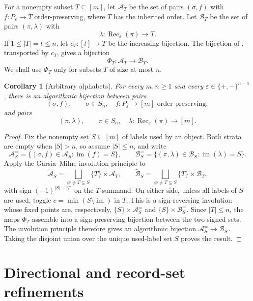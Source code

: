 \documentclass[10pt,a4paper]{amsart}
\newtheorem{corollary}[theorem]{Corollary}
\newcommand{\eps}{\varepsilon}
\begin{document}
For a nonempty subset \(T\subseteq[m]\), let \(\mathcal A_T\) be the set of
pairs \((\sigma,f)\) with \(f:P_\eps\to T\) order-preserving, where \(T\) has
the inherited order.  Let \(\mathcal B_T\) be the set of pairs
\((\pi,\lambda)\) with
\[
\lambda:\operatorname{Rec}_\eps(\pi)\to T.
\]
If \(1\le |T|=t\le n\), let \(c_T:[t]\to T\) be the increasing bijection.  The
bijection of , transported by \(c_T\), gives
a bijection
\[
\Phi_T:\mathcal A_T\longrightarrow \mathcal B_T.
\]
We shall use \(\Phi_T\) only for subsets \(T\) of size at most \(n\).

\begin{corollary}[Arbitrary alphabets]
\label{thm:direct-bijection-all-m}
For every \(m,n\ge1\) and every \(\eps\in\{+,-\}^{n-1}\), there is an
algorithmic bijection between pairs
\[
(\sigma,f),\qquad
\sigma\in S_n,\quad f:P_\eps\to[m]\text{ order-preserving},
\]
and pairs
\[
(\pi,\lambda),\qquad
\pi\in S_n,\quad
\lambda:\operatorname{Rec}_\eps(\pi)\to[m].
\]
\end{corollary}

\begin{proof}
Fix the nonempty set \(S\subseteq[m]\) of labels used by an object.  Both
strata are empty when \(|S|>n\), so assume \(|S|\le n\), and write
\[
\mathcal A_S^{=}
=\{(\sigma,f)\in\mathcal A_S:\operatorname{im}(f)=S\},
\qquad
\mathcal B_S^{=}
=\{(\pi,\lambda)\in\mathcal B_S:\operatorname{im}(\lambda)=S\}.
\]
Apply the Garsia--Milne involution principle \cite{GarsiaMilne} to
\[
\widetilde{\mathcal A}_S
=\bigsqcup_{\varnothing\ne T\subseteq S}\{T\}\times\mathcal A_T,
\qquad
\widetilde{\mathcal B}_S
=\bigsqcup_{\varnothing\ne T\subseteq S}\{T\}\times\mathcal B_T,
\]
with sign \((-1)^{|S|-|T|}\) on the \(T\)-summand.  On either side, unless
all labels of \(S\) are used, toggle
\(c=\min(S\setminus\operatorname{im})\) in \(T\).  This is a sign-reversing
involution whose fixed points are, respectively,
\(\{S\}\times\mathcal A_S^{=}\) and
\(\{S\}\times\mathcal B_S^{=}\).  Since \(|T|\le n\), the maps \(\Phi_T\)
assemble into a sign-preserving bijection between the two signed sets.
The involution principle therefore gives an algorithmic bijection
\(\mathcal A_S^{=}\longrightarrow\mathcal B_S^{=}\).  Taking the disjoint
union over the unique used-label set \(S\) proves the result.
\end{proof}

\section{Directional and record-set refinements}
\label{sec:signed-strict-edge-transfer}
\end{document}
